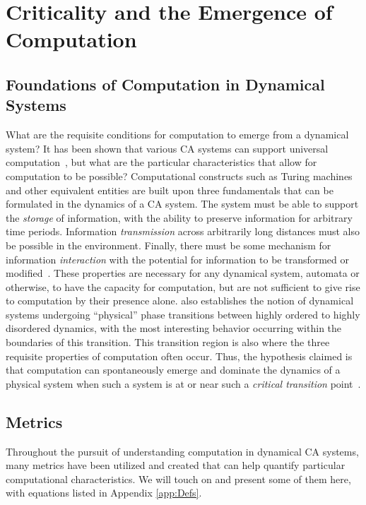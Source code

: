 \documentclass[a4paper,11pt,twoside]{report}
\begin{document}
\section{Criticality and the Emergence of Computation}
\label{sec:Crit}

\subsection{Foundations of Computation in Dynamical Systems}

What are the requisite conditions for computation to emerge from a dynamical system?
It has been shown that various CA systems can support universal computation~\cite{wf86}, but what are the particular characteristics that allow for computation to be possible? Computational constructs such as Turing machines and other equivalent entities are built upon three fundamentals that can be formulated in the dynamics of a CA system. The system must be able to support the \textit{storage} of information, with the ability to preserve information for arbitrary time periods. Information \textit{transmission} across arbitrarily long distances must also be possible in the environment. Finally, there must be some mechanism for information \textit{interaction} with the potential for information to be transformed or modified~\cite{la90}. These properties are necessary for any dynamical system, automata or otherwise, to have the capacity for computation, but are not sufficient to give rise to computation by their presence alone.
\citeauthor{la90} also establishes the notion of dynamical systems undergoing ``physical'' phase transitions between highly ordered to highly disordered dynamics, with the most interesting behavior occurring within the boundaries of this transition. This transition region is also where the three requisite properties of computation often occur. Thus, the hypothesis \citeauthor{la90} claimed is that computation can spontaneously emerge and dominate the dynamics of a physical system when such a system is at or near such a \textit{critical transition} point~\cite{la90}. 

\subsection{Metrics}
\label{subsec:metrics}
Throughout the pursuit of understanding computation in dynamical CA systems, many metrics have been utilized and created that can help quantify particular computational characteristics. We will touch on and present some of them here, with equations listed in Appendix \ref{app:Defs}.
\end{document}
